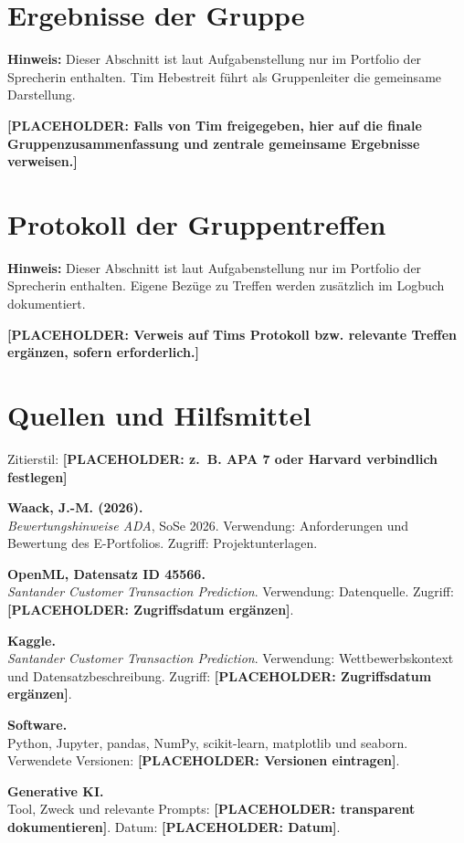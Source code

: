 \documentclass[11pt,a4paper]{article}
\newcommand{\placeholder}[1]{\textcolor{ADAgold}{\textbf{[PLACEHOLDER: #1]}}}
\newcommand{\sourceitem}[2]{\noindent\textbf{#1}\\#2\par\medskip}
\begin{document}
\section{Ergebnisse der Gruppe}
\textbf{Hinweis:} Dieser Abschnitt ist laut Aufgabenstellung nur im Portfolio der
Sprecherin enthalten. Tim Hebestreit führt als Gruppenleiter die gemeinsame Darstellung.

\placeholder{Falls von Tim freigegeben, hier auf die finale Gruppenzusammenfassung und
zentrale gemeinsame Ergebnisse verweisen.}

\section{Protokoll der Gruppentreffen}
\textbf{Hinweis:} Dieser Abschnitt ist laut Aufgabenstellung nur im Portfolio der
Sprecherin enthalten. Eigene Bezüge zu Treffen werden zusätzlich im Logbuch dokumentiert.

\placeholder{Verweis auf Tims Protokoll bzw. relevante Treffen ergänzen, sofern erforderlich.}

\section{Quellen und Hilfsmittel}
Zitierstil: \placeholder{z.~B. APA 7 oder Harvard verbindlich festlegen}

\sourceitem{Waack, J.-M. (2026).}{\emph{Bewertungshinweise ADA}, SoSe 2026. Verwendung:
Anforderungen und Bewertung des E-Portfolios. Zugriff: Projektunterlagen.}

\sourceitem{OpenML, Datensatz ID 45566.}{\emph{Santander Customer Transaction Prediction}.
Verwendung: Datenquelle. Zugriff: \placeholder{Zugriffsdatum ergänzen}.}

\sourceitem{Kaggle.}{\emph{Santander Customer Transaction Prediction}. Verwendung:
Wettbewerbskontext und Datensatzbeschreibung. Zugriff: \placeholder{Zugriffsdatum ergänzen}.}

\sourceitem{Software.}{Python, Jupyter, pandas, NumPy, scikit-learn, matplotlib und seaborn.
Verwendete Versionen: \placeholder{Versionen eintragen}.}

\sourceitem{Generative KI.}{Tool, Zweck und relevante Prompts:
\placeholder{transparent dokumentieren}. Datum: \placeholder{Datum}.}
\end{document}
